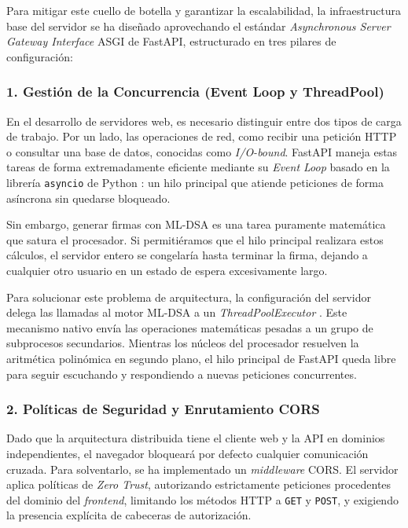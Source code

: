 \documentclass[11pt, a4paper]{report}
\theoremstyle{definition}
\begin{document}
Para mitigar este cuello de botella y garantizar la escalabilidad, la infraestructura base del servidor se ha diseñado aprovechando el estándar \textit{Asynchronous Server Gateway Interface} ASGI de FastAPI, estructurado en tres pilares de configuración:

\subsubsection*{1. Gestión de la Concurrencia (Event Loop y ThreadPool)}

En el desarrollo de servidores web, es necesario distinguir entre dos tipos de carga de trabajo. Por un lado, las operaciones de red, como recibir una petición HTTP o consultar una base de datos, conocidas como \textit{I/O-bound}. FastAPI maneja estas tareas de forma extremadamente eficiente mediante su \textit{Event Loop} basado en la librería \texttt{asyncio} de Python \cite{python_asyncio}: un hilo principal que atiende peticiones de forma asíncrona sin quedarse bloqueado.

Sin embargo, generar firmas con ML-DSA es una tarea puramente matemática que satura el procesador. Si permitiéramos que el hilo principal realizara estos cálculos, el servidor entero se congelaría hasta terminar la firma, dejando a cualquier otro usuario en un estado de espera excesivamente largo.

Para solucionar este problema de arquitectura, la configuración del servidor delega las llamadas al motor ML-DSA a un \textit{ThreadPoolExecutor} \cite{python_concurrent}. Este mecanismo nativo envía las operaciones matemáticas pesadas a un grupo de subprocesos secundarios. Mientras los núcleos del procesador resuelven la aritmética polinómica en segundo plano, el hilo principal de FastAPI queda libre para seguir escuchando y respondiendo a nuevas peticiones concurrentes.

\subsubsection*{2. Políticas de Seguridad y Enrutamiento CORS}

Dado que la arquitectura distribuida tiene el cliente web y la API en dominios independientes, el navegador bloqueará por defecto cualquier comunicación cruzada. Para solventarlo, se ha implementado un \textit{middleware} CORS. El servidor aplica políticas de \textit{Zero Trust}, autorizando estrictamente peticiones procedentes del dominio del \textit{frontend}, limitando los métodos HTTP a \texttt{GET} y \texttt{POST}, y exigiendo la presencia explícita de cabeceras de autorización.
\end{document}
